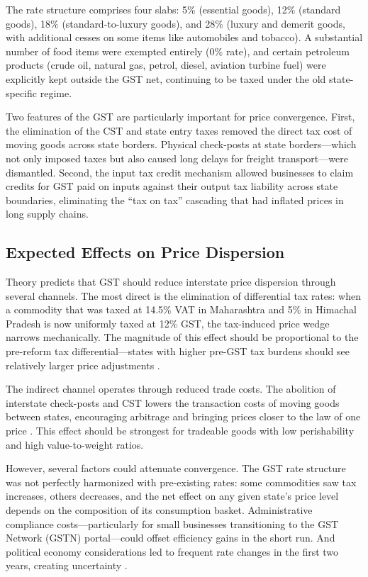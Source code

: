 \documentclass[12pt]{article}
\begin{document}
The rate structure comprises four slabs: 5\% (essential goods), 12\% (standard goods), 18\% (standard-to-luxury goods), and 28\% (luxury and demerit goods, with additional cesses on some items like automobiles and tobacco). A substantial number of food items were exempted entirely (0\% rate), and certain petroleum products (crude oil, natural gas, petrol, diesel, aviation turbine fuel) were explicitly kept outside the GST net, continuing to be taxed under the old state-specific regime.

Two features of the GST are particularly important for price convergence. First, the elimination of the CST and state entry taxes removed the direct tax cost of moving goods across state borders. Physical check-posts at state borders---which not only imposed taxes but also caused long delays for freight transport---were dismantled. Second, the input tax credit mechanism allowed businesses to claim credits for GST paid on inputs against their output tax liability across state boundaries, eliminating the ``tax on tax'' cascading that had inflated prices in long supply chains.

\subsection{Expected Effects on Price Dispersion}

Theory predicts that GST should reduce interstate price dispersion through several channels. The most direct is the elimination of differential tax rates: when a commodity that was taxed at 14.5\% VAT in Maharashtra and 5\% in Himachal Pradesh is now uniformly taxed at 12\% GST, the tax-induced price wedge narrows mechanically. The magnitude of this effect should be proportional to the pre-reform tax differential---states with higher pre-GST tax burdens should see relatively larger price adjustments \citep{samuelson1954transfer}.

The indirect channel operates through reduced trade costs. The abolition of interstate check-posts and CST lowers the transaction costs of moving goods between states, encouraging arbitrage and bringing prices closer to the law of one price \citep{stigler1961economics}. This effect should be strongest for tradeable goods with low perishability and high value-to-weight ratios.

However, several factors could attenuate convergence. The GST rate structure was not perfectly harmonized with pre-existing rates: some commodities saw tax increases, others decreases, and the net effect on any given state's price level depends on the composition of its consumption basket. Administrative compliance costs---particularly for small businesses transitioning to the GST Network (GSTN) portal---could offset efficiency gains in the short run. And political economy considerations led to frequent rate changes in the first two years, creating uncertainty \citep{gstcouncil2017report}.
\end{document}
